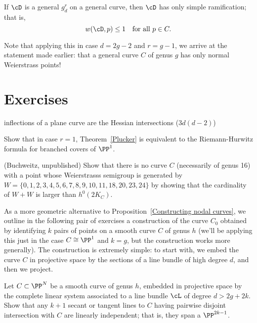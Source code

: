 \begin{theorem}
If $\cD$ is a general $g^r_d$ on a general curve, then $\cD$ has only simple ramification; that is,
$$
w(\cD, p) \leq 1 \quad \text{for all } p \in C.
$$
\end{theorem}

Note that applying this in case $d=2g-2$ and $r = g-1$, we arrive at the statement made earlier: that a general curve $C$ of genus $g$ has only normal Weierstrass points!

\section{Exercises}
\begin{exercise}\label{Hessian exercise}
 inflections of a plane curve are the Hessian intersections ($3d(d-2)$)
\end{exercise}

\begin{exercise}
Show that in case $r=1$, Theorem~\ref{Plucker} is equivalent to the Riemann-Hurwitz formula for branched covers of $\PP^1$.
\end{exercise}

\begin{exercise}(Buchweitz, unpublished)
Show that there is no curve $C$ (necessarily of genus 16) with a point whose Weierstrasss semigroup
is generated by
$W =\{0,1,2,3,4,5,6,7,8,9,10,11, 18,20,23,24\}$
by showing that the cardinality of $W+W$ is larger than $h^0(2K_C)$.
\end{exercise}

As a more geometric alternative to Proposition~\ref{Constructing nodal curves}, we outline in the following pair of exercises a construction of the curve $C_0$ obtained by identifying $k$ pairs of points on a smooth curve $C$ of genus $h$ (we'll be applying this just in the case $C \cong \PP^1$ and $k=g$, but the construction works more generally). The construction is extremely simple: to start with, we embed the curve $C$ in projective space by the sections of a line bundle of high degree $d$, and then we project.

\begin{exercise}\label{independent secants} Let $C \subset \PP^N$ be a smooth curve of genus $h$, embedded in projective space by the complete linear system associated to a line bundle $\cL$ of degree $d > 2g + 2k$. Show that any $k+1$ secant or tangent lines to $C$  having pairwise disjoint intersection with $C$ are linearly independent; that is, they span a $\PP^{2k-1}$.
\end{exercise}

